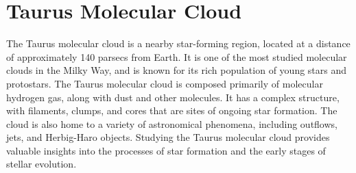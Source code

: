 \chapter{Taurus Molecular Cloud}
The Taurus molecular cloud is a nearby star-forming region, located at a distance of approximately 140 parsecs from Earth. It is one of the most studied molecular clouds in the Milky Way, and is known for its rich population of young stars and protostars. The Taurus molecular cloud is composed primarily of molecular hydrogen gas, along with dust and other molecules. It has a complex structure, with filaments, clumps, and cores that are sites of ongoing star formation. The cloud is also home to a variety of astronomical phenomena, including outflows, jets, and Herbig-Haro objects. Studying the Taurus molecular cloud provides valuable insights into the processes of star formation and the early stages of stellar evolution.